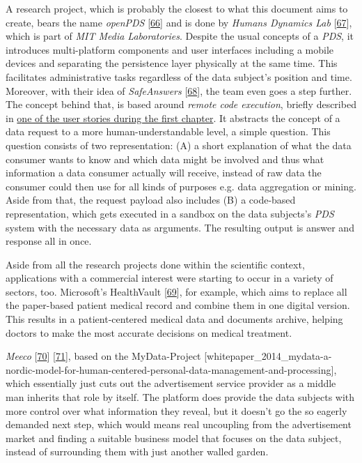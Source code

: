 \documentclass[12pt,english,a4paper,titlepage,cleardoublepage=empty,dottedtoc]{report}
\begin{document}
A research project, which is probably the closest to what this document
aims to create, bears the name \emph{openPDS}
{[}\protect\hyperlink{ref-paper_2012_openpds_on-trusted-use-of-large-scale-personal-data}{66}{]}
and is done by \emph{Humans Dynamics Lab}
{[}\protect\hyperlink{ref-web_mit_openpds-safeanswers-project-page}{67}{]},
which is part of \emph{MIT Media Laboratories}. Despite the usual
concepts of a \emph{PDS}, it introduces multi-platform components and
user interfaces including a mobile devices and separating the
persistence layer physically at the same time. This facilitates
administrative tasks regardless of the data subject's position and time.
Moreover, with their idea of \emph{SafeAnswers}
{[}\protect\hyperlink{ref-paper_2014_openpds_protecting-privacy-of-meta-data-through-safeanswers}{68}{]},
the team even goes a step further. The concept behind that, is based
around \emph{remote code execution}, briefly described in
\protect\hyperlink{header-applying-for-a-loan-and-checking-creditworthiness}{one
of the user stories during the first chapter}. It abstracts the concept
of a data request to a more human-understandable level, a simple
question. This question consists of two representation: (A) a short
explanation of what the data consumer wants to know and which data might
be involved and thus what information a data consumer actually will
receive, instead of raw data the consumer could then use for all kinds
of purposes e.g. data aggregation or mining. Aside from that, the
request payload also includes (B) a code-based representation, which
gets executed in a sandbox on the data subjects's \emph{PDS} system with
the necessary data as arguments. The resulting output is answer and
response all in once.

Aside from all the research projects done within the scientific context,
applications with a commercial interest were starting to occur in a
variety of sectors, too. Microsoft's HealthVault
{[}\protect\hyperlink{ref-web_microsoft_healthvault}{69}{]}, for
example, which aims to replace all the paper-based patient medical
record and combine them in one digital version. This results in a
patient-centered medical data and documents archive, helping doctors to
make the most accurate decisions on medical treatment.

\emph{Meeco} {[}\protect\hyperlink{ref-web_meeco_how-it-works}{70}{]}
{[}\protect\hyperlink{ref-slides_2015_meeco-case-study}{71}{]}, based on
the MyData-Project
{[}whitepaper\_2014\_mydata-a-nordic-model-for-human-centered-personal-data-management-and-processing{]},
which essentially just cuts out the advertisement service provider as a
middle man inherits that role by itself. The platform does provide the
data subjects with more control over what information they reveal, but
it doesn't go the so eagerly demanded next step, which would means real
uncoupling from the advertisement market and finding a suitable business
model that focuses on the data subject, instead of surrounding them with
just another walled garden.
\end{document}

